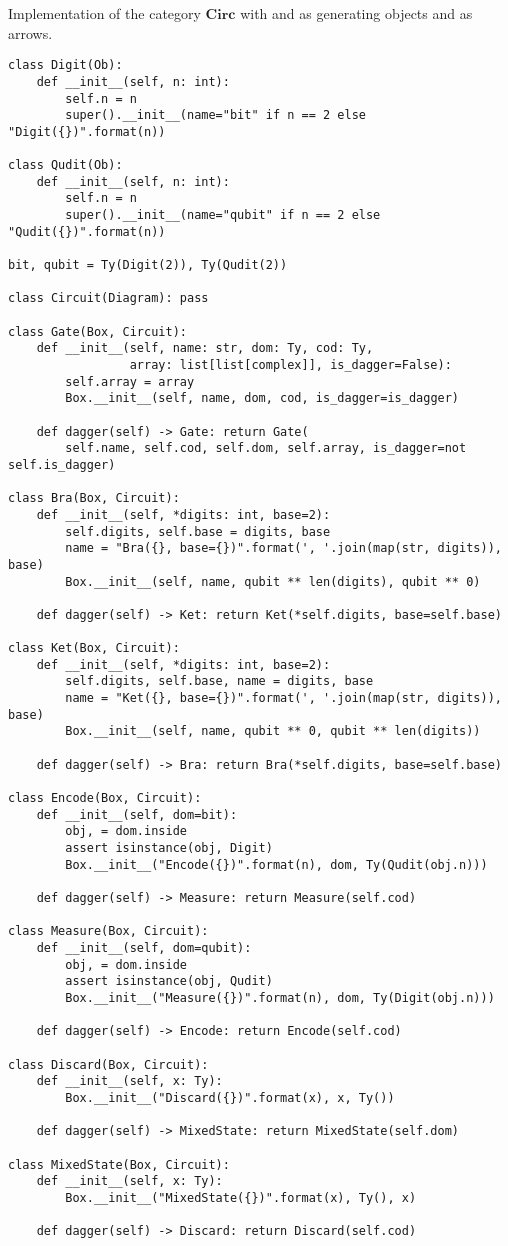 \begin{python}
{\normalfont Implementation of the category $\mathbf{Circ}$ with  and  as generating objects and  as arrows.}

\begin{verbatim}
class Digit(Ob):
    def __init__(self, n: int):
        self.n = n
        super().__init__(name="bit" if n == 2 else "Digit({})".format(n))

class Qudit(Ob):
    def __init__(self, n: int):
        self.n = n
        super().__init__(name="qubit" if n == 2 else "Qudit({})".format(n))

bit, qubit = Ty(Digit(2)), Ty(Qudit(2))

class Circuit(Diagram): pass

class Gate(Box, Circuit):
    def __init__(self, name: str, dom: Ty, cod: Ty,
                 array: list[list[complex]], is_dagger=False):
        self.array = array
        Box.__init__(self, name, dom, cod, is_dagger=is_dagger)

    def dagger(self) -> Gate: return Gate(
        self.name, self.cod, self.dom, self.array, is_dagger=not self.is_dagger)

class Bra(Box, Circuit):
    def __init__(self, *digits: int, base=2):
        self.digits, self.base = digits, base
        name = "Bra({}, base={})".format(', '.join(map(str, digits)), base)
        Box.__init__(self, name, qubit ** len(digits), qubit ** 0)

    def dagger(self) -> Ket: return Ket(*self.digits, base=self.base)

class Ket(Box, Circuit):
    def __init__(self, *digits: int, base=2):
        self.digits, self.base, name = digits, base
        name = "Ket({}, base={})".format(', '.join(map(str, digits)), base)
        Box.__init__(self, name, qubit ** 0, qubit ** len(digits))

    def dagger(self) -> Bra: return Bra(*self.digits, base=self.base)

class Encode(Box, Circuit):
    def __init__(self, dom=bit):
        obj, = dom.inside
        assert isinstance(obj, Digit)
        Box.__init__("Encode({})".format(n), dom, Ty(Qudit(obj.n)))

    def dagger(self) -> Measure: return Measure(self.cod)

class Measure(Box, Circuit):
    def __init__(self, dom=qubit):
        obj, = dom.inside
        assert isinstance(obj, Qudit)
        Box.__init__("Measure({})".format(n), dom, Ty(Digit(obj.n)))

    def dagger(self) -> Encode: return Encode(self.cod)

class Discard(Box, Circuit):
    def __init__(self, x: Ty):
        Box.__init__("Discard({})".format(x), x, Ty())

    def dagger(self) -> MixedState: return MixedState(self.dom)

class MixedState(Box, Circuit):
    def __init__(self, x: Ty):
        Box.__init__("MixedState({})".format(x), Ty(), x)

    def dagger(self) -> Discard: return Discard(self.cod)
\end{verbatim}
\end{python}

